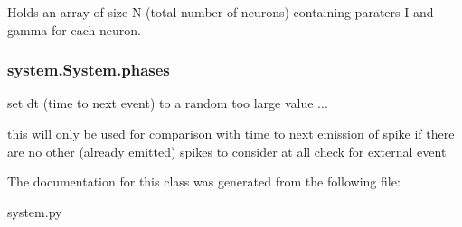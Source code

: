Holds an array of size N (total number of neurons) containing paraters I and gamma for each neuron. 

\hypertarget{classsystem_1_1System_acb0b0396cccf92c3cd63c17b14660490}{
\subsubsection[{phases}]{\setlength{\rightskip}{0pt plus 5cm}system.\-System.\-phases}}\label{classsystem_1_1System_acb0b0396cccf92c3cd63c17b14660490}


set dt (time to next event) to a random too large value ... 

this will only be used for comparison with time to next emission of spike if there are no other (already emitted) spikes to consider at all check for external event 

The documentation for this class was generated from the following file\-:\begin{DoxyCompactItemize}
\item 
system.\-py\end{DoxyCompactItemize}
